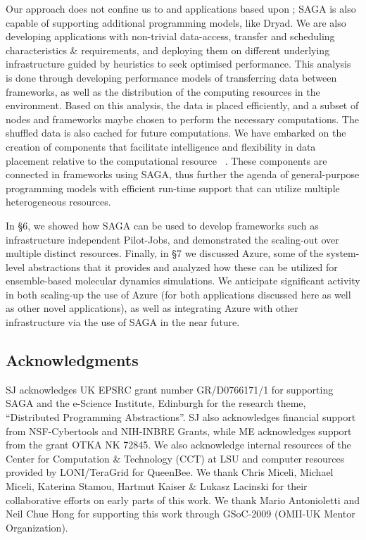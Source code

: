 \documentclass[graybox]{svmult}
\begin{document}
Our approach does not confine us to \mr and applications based upon
\mr; SAGA is also capable of supporting additional programming models,
like Dryad.  We are also developing applications with non-trivial
data-access, transfer and scheduling characteristics \& requirements,
and deploying them on different underlying infrastructure guided by
heuristics to seek optimised performance.
This analysis is done through developing performance models of
transferring data between frameworks, as well as the distribution of
the computing resources in the environment. Based on this analysis,
the data is placed efficiently, and a subset of nodes and frameworks
maybe chosen to perform the necessary computations. The shuffled data
is also cached for future computations.  We have embarked on the
creation of components that facilitate intelligence and flexibility in
data placement relative to the computational resource
~\cite{saga_dic_royalsoc09}. These components are connected in
frameworks using SAGA, thus further the agenda of general-purpose
programming models with efficient run-time support that can utilize
multiple heterogeneous resources.

In \S6, we showed how SAGA can be used to develop frameworks such as
infrastructure independent Pilot-Jobs, and demonstrated the
scaling-out over multiple distinct resources. Finally, in \S7 we
discussed Azure, some of the system-level abstractions that it
provides and analyzed how these can be utilized for ensemble-based
molecular dynamics simulations. We anticipate significant activity in
both scaling-up the use of Azure (for both applications discussed here
as well as other novel applications), as well as integrating Azure
with other infrastructure via the use of SAGA in the near future.


\subsection*{Acknowledgments}

\small{ SJ acknowledges UK EPSRC grant number GR/D0766171/1 for
  supporting SAGA and the e-Science Institute, Edinburgh for the
  research theme, ``Distributed Programming Abstractions''.  SJ also
  acknowledges financial support from NSF-Cybertools and NIH-INBRE
  Grants, while ME acknowledges support from the grant OTKA NK 72845.
  We also acknowledge internal resources of the Center for Computation
  \& Technology (CCT) at LSU and computer resources provided by
  LONI/TeraGrid for QueenBee.  We thank Chris Miceli, Michael Miceli,
  Katerina Stamou, Hartmut Kaiser \& Lukasz Lacinski for their
  collaborative efforts on early parts of this work. We thank Mario
  Antonioletti and Neil Chue Hong for supporting this work through
  GSoC-2009 (OMII-UK Mentor Organization).}



\end{document}
